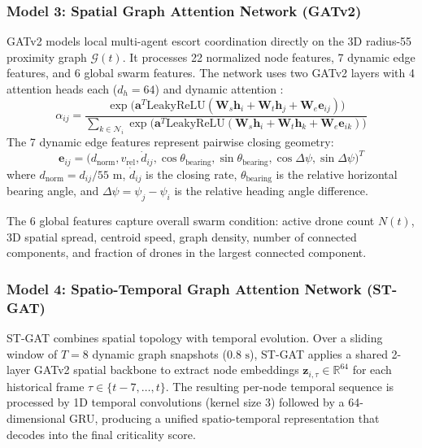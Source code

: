 \documentclass[9pt]{ieeeconf}
\newcommand{\RR}{\mathbb{R}}
\begin{document}
\subsubsection{Model 3: Spatial Graph Attention Network (GATv2)}
GATv2 models local multi-agent escort coordination directly on the 3D radius-55 proximity graph $\mathcal{G}(t)$. It processes 22 normalized node features, 7 dynamic edge features, and 6 global swarm features. The network uses two GATv2 layers with 4 attention heads each ($d_h = 64$) and dynamic attention \cite{brody2022how}:
\begin{equation}
\alpha_{ij} = \frac{\exp\big(\mathbf{a}^T \text{LeakyReLU}(\mathbf{W}_s \mathbf{h}_i + \mathbf{W}_t \mathbf{h}_j + \mathbf{W}_e \mathbf{e}_{ij})\big)}{\sum_{k \in \mathcal{N}_i} \exp\big(\mathbf{a}^T \text{LeakyReLU}(\mathbf{W}_s \mathbf{h}_i + \mathbf{W}_t \mathbf{h}_k + \mathbf{W}_e \mathbf{e}_{ik})\big)}
\end{equation}
The 7 dynamic edge features represent pairwise closing geometry:
\begin{equation}
\mathbf{e}_{ij} = \big( d_{\text{norm}}, v_{\text{rel}}, \dot{d}_{ij}, \cos\theta_{\text{bearing}}, \sin\theta_{\text{bearing}}, \cos\Delta\psi, \sin\Delta\psi \big)^T
\end{equation}
where $d_{\text{norm}} = d_{ij}/55\text{ m}$, $\dot{d}_{ij}$ is the closing rate, $\theta_{\text{bearing}}$ is the relative horizontal bearing angle, and $\Delta\psi = \psi_j - \psi_i$ is the relative heading angle difference.

The 6 global features capture overall swarm condition: active drone count $N(t)$, 3D spatial spread, centroid speed, graph density, number of connected components, and fraction of drones in the largest connected component.

\subsubsection{Model 4: Spatio-Temporal Graph Attention Network (ST-GAT)}
ST-GAT combines spatial topology with temporal evolution. Over a sliding window of $T = 8$ dynamic graph snapshots ($0.8\text{ s}$), ST-GAT applies a shared 2-layer GATv2 spatial backbone to extract node embeddings $\mathbf{z}_{i,\tau} \in \RR^{64}$ for each historical frame $\tau \in \{t-7, \dots, t\}$. The resulting per-node temporal sequence is processed by 1D temporal convolutions (kernel size 3) followed by a 64-dimensional GRU, producing a unified spatio-temporal representation that decodes into the final criticality score.
\end{document}
